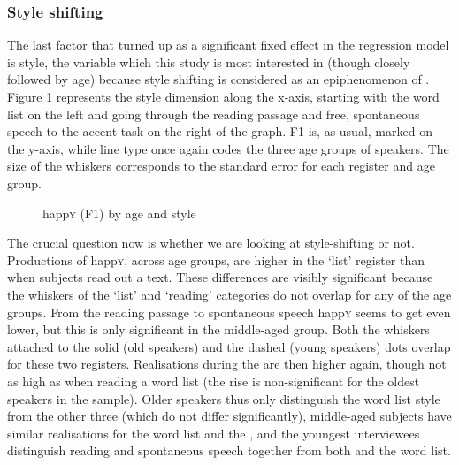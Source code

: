 \subsubsection{Style shifting}
\label{sec.prod.res.vow.happy.f1.shifting}

The last factor that turned up as a significant fixed effect in the regression model is style, the variable which this study is most interested in (though closely followed by age) because style shifting is considered as an epiphenomenon of .
Figure \ref{fig.line.f1w.happy.tot} represents the style dimension along the x-axis, starting with the word list on the left and going through the reading passage and free, spontaneous speech to the accent  task on the right of the graph.
F1 is, as usual, marked on the y-axis, while line type once again codes the three age groups of speakers.
The size of the whiskers corresponds to the standard error for each register and age group.

\begin{figure}[h!]
	\centering
		\resizebox{0.5\linewidth}{!}{} 
	\caption{happ\textsc{y} (F1) by age and style}
	\label{fig.line.f1w.happy.tot}
\end{figure}

The crucial question now is whether we are looking at style-shifting or not.
Productions of happ\textsc{y}, across age groups, are higher in the `list' register than when subjects read out a text.
These differences are visibly significant because the whiskers of the `list' and `reading' categories do not overlap for any of the age groups.
From the reading passage to spontaneous speech happ\textsc{y} seems to get even lower, but this is only significant in the middle-aged group.
Both the whiskers attached to the solid (old speakers) and the dashed (young speakers) dots overlap for these two registers.
Realisations during the  are then higher again, though not as high as when reading a word list (the rise is non-significant for the oldest speakers in the sample).
Older speakers thus only distinguish the word list style from the other three (which do not differ significantly), middle-aged subjects have similar realisations for the word list and the , and the youngest interviewees distinguish reading and spontaneous speech together from both  and the word list.

